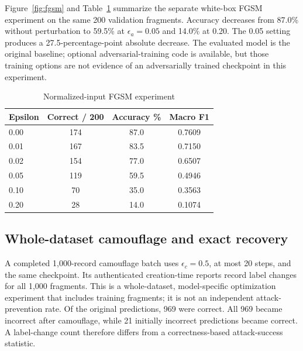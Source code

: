 \documentclass{jpp}
\begin{document}
Figure~\ref{fig:fgsm} and Table~\ref{tab:fgsm} summarize the separate white-box FGSM experiment on the same 200 validation fragments. Accuracy decreases from 87.0\% without perturbation to 59.5\% at $\epsilon_a=0.05$ and 14.0\% at 0.20. The 0.05 setting produces a 27.5-percentage-point absolute decrease. The evaluated model is the original baseline; optional adversarial-training code is available, but those training options are not evidence of an adversarially trained checkpoint in this experiment.

\begin{table}
\centering
\caption{Normalized-input FGSM experiment}\label{tab:fgsm}
\small
\begin{tabular}{lccc}
\hline
Epsilon & Correct / 200 & Accuracy \% & Macro F1 \\
\hline
0.00 & 174 & 87.0 & 0.7609 \\
0.01 & 167 & 83.5 & 0.7150 \\
0.02 & 154 & 77.0 & 0.6507 \\
0.05 & 119 & 59.5 & 0.4946 \\
0.10 & 70 & 35.0 & 0.3563 \\
0.20 & 28 & 14.0 & 0.1074 \\
\hline
\end{tabular}
\end{table}

\subsection{Whole-dataset camouflage and exact recovery}

A completed 1,000-record camouflage batch uses $\epsilon_c=0.5$, at most 20 steps, and the same checkpoint. Its authenticated creation-time reports record label changes for all 1,000 fragments. This is a whole-dataset, model-specific optimization experiment that includes training fragments; it is not an independent attack-prevention rate. Of the original predictions, 969 were correct. All 969 became incorrect after camouflage, while 21 initially incorrect predictions became correct. A label-change count therefore differs from a correctness-based attack-success statistic.
\end{document}
